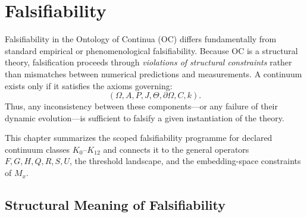 

\section{Falsifiability}
\label{sec:falsifiability-master}

Falsifiability in the Ontology of Continua (OC) differs fundamentally
from standard empirical or phenomenological falsifiability.
Because OC is a structural theory, falsification proceeds through
\emph{violations of structural constraints} rather than mismatches
between numerical predictions and measurements.
A continuum exists only if it satisfies the axioms governing:
\[
(\Omega, A, P, J, \Theta, \partial\Omega, C, k).
\]
Thus, any inconsistency between these components—or any failure of
their dynamic evolution—is sufficient to falsify a given instantiation
of the theory.

This chapter summarizes the scoped falsifiability programme for
declared continuum classes $K_0$–$K_{12}$ and connects it to the general operators 
$F, G, H, Q, R, S, U$, the threshold landscape, and the embedding-space
constraints of $M_x$.



\subsection{Structural Meaning of Falsifiability}

